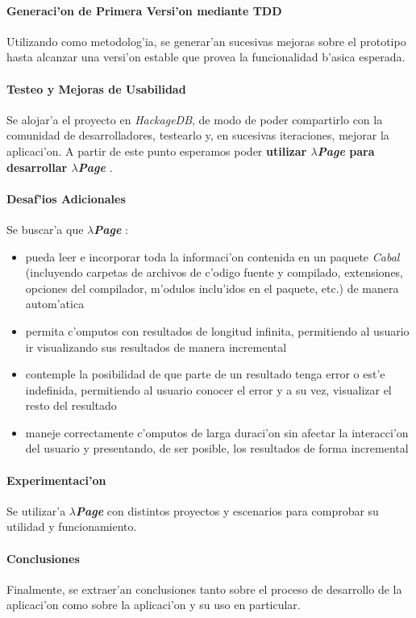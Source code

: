 \documentclass[a4paper]{article}
\newcommand{\hpage}{\textbf{\textsl{$\lambda$Page}} }
\begin{document}
\paragraph{Generaci'on de Primera Versi'on mediante TDD} Utilizando  como metodolog'ia, se generar'an sucesivas mejoras sobre el prototipo hasta alcanzar una versi'on estable que provea la funcionalidad b'asica esperada.
\paragraph{Testeo y Mejoras de Usabilidad} Se alojar'a el proyecto en \textsl{HackageDB}, de modo de poder compartirlo con la comunidad de desarrolladores, testearlo y, en sucesivas iteraciones, mejorar la aplicaci'on.  A partir de este punto esperamos poder \textbf{utilizar \hpage para desarrollar \hpage}.
\paragraph{Desaf'ios Adicionales} Se buscar'a que \hpage:
\begin{itemize}
	\item pueda leer e incorporar toda la informaci'on contenida en un paquete \textsl{Cabal} (incluyendo carpetas de archivos de c'odigo fuente y compilado, extensiones, opciones del compilador, m'odulos inclu'idos en el paquete, etc.) de manera autom'atica
	\item permita c'omputos con resultados de longitud infinita, permitiendo al usuario ir visualizando sus resultados de manera incremental
	\item contemple la posibilidad de que parte de un resultado tenga error o est'e indefinida, permitiendo al usuario conocer el error y a su vez, visualizar el resto del resultado
	\item maneje correctamente c'omputos de larga duraci'on sin afectar la interacci'on del usuario y presentando, de ser posible, los resultados de forma incremental
\end{itemize}
\paragraph{Experimentaci'on} Se utilizar'a \hpage con distintos proyectos y escenarios para comprobar su utilidad y funcionamiento.
\paragraph{Conclusiones} Finalmente, se extraer'an conclusiones tanto sobre el proceso de desarrollo de la aplicaci'on como sobre la aplicaci'on y su uso en particular.
\end{document}
